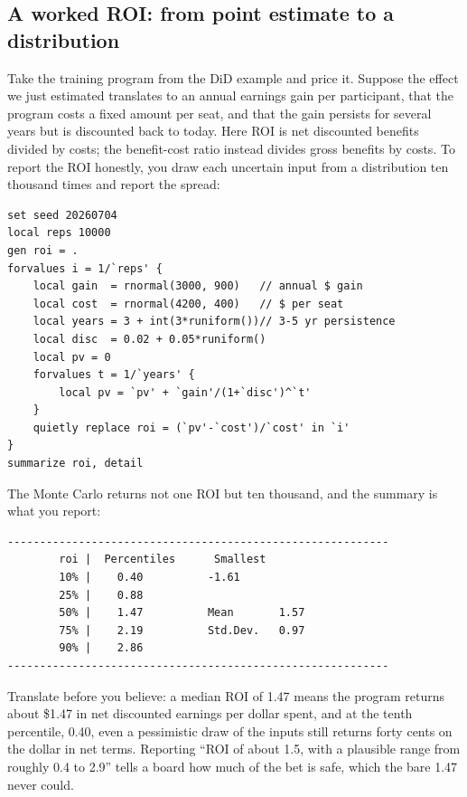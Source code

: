 \subsection{A worked ROI: from point estimate to a distribution}
Take the training program from the DiD example and price it. Suppose the effect we just estimated translates to an annual earnings gain per participant, that the program costs a fixed amount per seat, and that the gain persists for several years but is discounted back to today. Here ROI is net discounted benefits divided by costs; the benefit-cost ratio instead divides gross benefits by costs. To report the ROI honestly, you draw each uncertain input from a distribution ten thousand times and report the spread:
\par
{\footnotesize
\begin{verbatim}
set seed 20260704
local reps 10000
gen roi = .
forvalues i = 1/`reps' {
    local gain  = rnormal(3000, 900)   // annual $ gain
    local cost  = rnormal(4200, 400)   // $ per seat
    local years = 3 + int(3*runiform())// 3-5 yr persistence
    local disc  = 0.02 + 0.05*runiform()
    local pv = 0
    forvalues t = 1/`years' {
        local pv = `pv' + `gain'/(1+`disc')^`t'
    }
    quietly replace roi = (`pv'-`cost')/`cost' in `i'
}
summarize roi, detail
\end{verbatim}
}
The Monte Carlo returns not one ROI but ten thousand, and the summary is what you report:
\par
{\footnotesize
\begin{verbatim}
-----------------------------------------------------------
        roi |  Percentiles      Smallest
        10% |    0.40          -1.61
        25% |    0.88
        50% |    1.47          Mean       1.57
        75% |    2.19          Std.Dev.   0.97
        90% |    2.86
-----------------------------------------------------------
\end{verbatim}
}
Translate before you believe: a median ROI of 1.47 means the program returns about \$1.47 in net discounted earnings per dollar spent, and at the tenth percentile, 0.40, even a pessimistic draw of the inputs still returns forty cents on the dollar in net terms. Reporting \enquote{ROI of about 1.5, with a plausible range from roughly 0.4 to 2.9} tells a board how much of the bet is safe, which the bare 1.47 never could.

